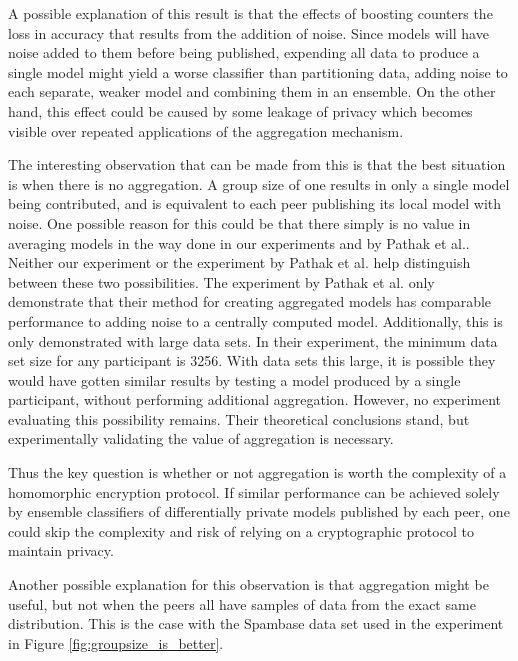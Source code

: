 A possible explanation of this result is that the effects of boosting counters the loss in accuracy that results from the addition of noise. Since models will have noise added to them before being published, expending all data to produce a single model might yield a worse classifier than partitioning data, adding noise to each separate, weaker model and combining them in an ensemble. On the other hand, this effect could be caused by some leakage of privacy which becomes visible over repeated applications of the aggregation mechanism.  

The interesting observation that can be made from this is that the best situation is when there is no aggregation. A group size of one results in only a single model being contributed, and is equivalent to each peer publishing its local model with noise. One possible reason for this could be that there simply is no value in averaging models in the way done in our experiments and by Pathak et al.\cite{pathak2010diffprivhomo}. Neither our experiment or the experiment by Pathak et al. help distinguish between these two possibilities. The experiment by Pathak et al. only demonstrate that their method for creating aggregated models has comparable performance to adding noise to a centrally computed model. Additionally, this is only demonstrated with large data sets. In their experiment, the minimum data set size for any participant is 3256. With data sets this large, it is possible they would have gotten similar results by testing a model produced by a single participant, without performing additional aggregation. However, no experiment evaluating this possibility remains. Their theoretical conclusions stand, but experimentally validating the value of aggregation is necessary.

 Thus the key question is whether or not aggregation is worth the complexity of a homomorphic encryption protocol. If similar performance can be achieved solely by ensemble classifiers of differentially private models published by each peer, one could skip the complexity and risk of relying on a cryptographic protocol to maintain privacy.

Another possible explanation for this observation is that aggregation might be useful, but not when the peers all have samples of data from the exact same distribution. This is the case with the Spambase data set used in the experiment in Figure \ref{fig:groupsize_is_better}.


